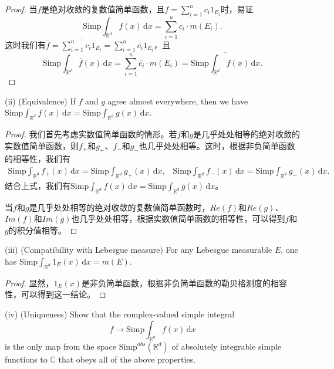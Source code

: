 \documentclass[reqno,a4paper,10pt]{amsart}
\newcommand\dif{\,\mathrm{d}}
\begin{document}
\begin{proof}
    当$f$是绝对收敛的复数值简单函数，且$f=\sum_{i=1}^n c_i 1_{E_i}$时，易证
    \begin{equation}
        \mathrm{Simp}\int_{\mathbb{R}^d}  f(x)\dif x = \sum_{i=1}^n c_i \cdot m(E_i).
        \label{Uniqueness}
    \end{equation}
    这时我们有$\overline{f}=\overline{\sum_{i=1}^nc_i 1_{E_i}}=\sum_{i=1}^n \overline{c_i}1_{E_i}$，且
    \begin{equation*}
        \mathrm{Simp} \int_{\mathbb{R}^d} \overline{f}(x)\dif x = \sum_{i=1}^n \overline{c_i}\cdot m(E_i)=\overline{\mathrm{Simp}\int_{\mathbb{R}^d} f(x)\dif x}.
    \end{equation*}
\end{proof}
(ii) (Equivalence) If $f$ and $g$ agree almost everywhere, then we have \\$\mathrm{Simp}\int_{\mathbb{R}^d} f(x)\dif x=\mathrm{Simp}\int_{\mathbb{R}^d} g(x)\dif x$.
\begin{proof}
    我们首先考虑实数值简单函数的情形。若$f$和$g$是几乎处处相等的绝对收敛的实数值简单函数，则$f_+$和$g_+$、$f_-$和$g_-$也几乎处处相等。这时，根据非负简单函数的相等性，我们有
    \begin{equation*}
        \begin{split}
            \mathrm{Simp}\int_{\mathbb{R}^d} f_+(x)\dif x = \mathrm{Simp}\int_{\mathbb{R}^d} g_+(x)\dif x,\;\;\;\mathrm{Simp}\int_{\mathbb{R}^d} f_-(x)\dif x = \mathrm{Simp}\int_{\mathbb{R}^d} g_-(x)\dif x.
        \end{split}
    \end{equation*}
    结合上式，我们有$\mathrm{Simp}\int_{\mathbb{R}^d} f(x)\dif x=\mathrm{Simp}\int_{\mathbb{R}^d} g(x)\dif x$。
    
    当$f$和$g$是几乎处处相等的绝对收敛的复数值简单函数时，$Re(f)$和$Re(g)$、$Im(f)$和$Im(g)$也几乎处处相等，根据实数值简单函数的相等性，可以得到$f$和$g$的积分值相等。
\end{proof}
(iii) (Compatibility with Lebesgue measure) For any Lebesgue measurable $E$, one has $\mathrm{Simp} \int_{\mathbb{R}^d} 1_{E}(x)\dif x=m(E)$.
\begin{proof}
    显然，$1_{E}(x)$是非负简单函数，根据非负简单函数的勒贝格测度的相容性，可以得到这一结论。
\end{proof}
(iv) (Uniqueness) Show that the complex-valued simple integral 
\begin{equation*}
    f \to \mathrm{Simp} \int_{\mathbb{R}^d} f(x) \dif x
\end{equation*}
is the only map from the space $\mathrm{Simp}^{abs}(\mathbb{R}^d)$ of absolutely integrable simple functions to $\mathbb{C}$ that obeys all of the above properties.
\end{document}
